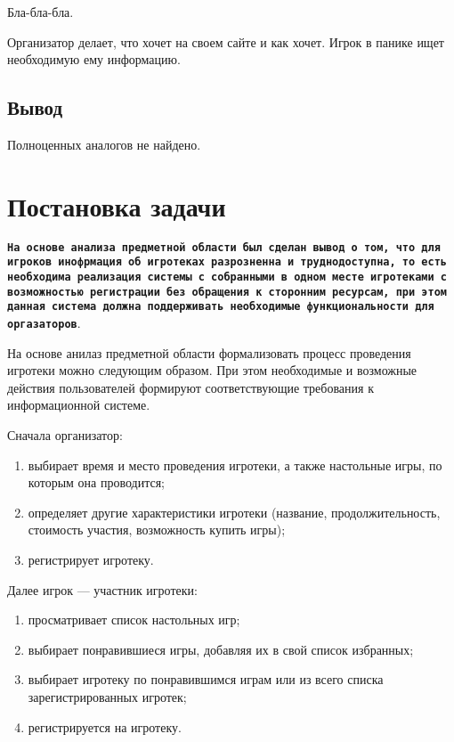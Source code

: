 Бла-бла-бла. 

Организатор делает, что хочет на своем сайте и как хочет. Игрок в панике ищет
необходимую ему информацию.

\subsection*{Вывод}

Полноценных аналогов не найдено.


\section{Постановка задачи}

\texttt{\textbf{На основе анализа предметной области был сделан вывод о том, что
        для игроков инофрмация об игротеках разрозненна и труднодоступна, то
        есть необходима реализация системы с собранными в одном месте игротеками
        с возможностью регистрации без обращения к сторонним ресурсам, при этом
        данная система должна поддерживать необходимые функциональности для
        оргазаторов}}.

На основе анилаз предметной области формализовать процесс проведения игротеки
можно следующим образом. При этом необходимые и возможные действия
пользователей формируют соответствующие требования к информационной
системе.

Сначала организатор:
\begin{enumerate}[label=\arabic*)]
    \item выбирает время и место проведения игротеки, а также настольные игры,
      по которым она проводится;
    \item определяет другие характеристики игротеки (название,
        продолжительность, стоимость участия, возможность купить игры);
    \item регистрирует игротеку.
\end{enumerate}

Далее игрок --- участник игротеки:
\begin{enumerate}[label=\arabic*)]
    \item просматривает список настольных игр;
    \item выбирает понравившиеся игры, добавляя их в свой список избранных;
    \item выбирает игротеку по понравившимся играм или из всего списка
        зарегистрированных игротек;
    \item регистрируется на игротеку.
\end{enumerate}

